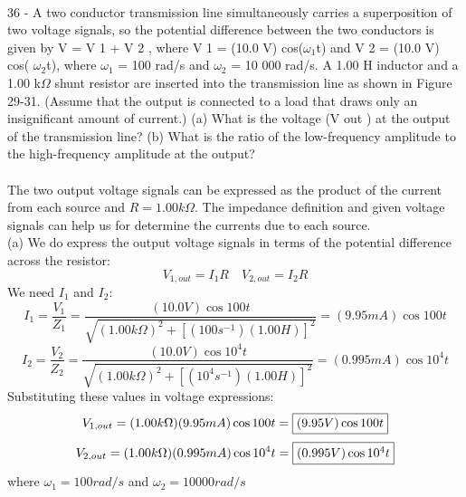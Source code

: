\documentclass{report}
\begin{document}
\paragraph{}
36 - A two conductor transmission line simultaneously carries a superposition of two voltage signals, so the potential difference between the two conductors is given by V = V 1 + V 2 , where V 1 = (10.0 V) cos($\omega{_1}$t) and V 2 = (10.0 V) cos( $\omega{_2}$t), where $\omega{_1}$ = 100 rad/s and $\omega{_2}$ = 10 000 rad/s. A 1.00 H inductor and a 1.00 k$\Omega$ shunt resistor are inserted into the transmission line as shown in Figure 29-31. (Assume that the output is connected to a load that draws only an insignificant amount of current.) (a) What is the voltage (V out ) at the output of the transmission line? (b) What is the ratio of the low-frequency amplitude to the high-frequency amplitude at the output?\\
\\
The two output voltage signals can be expressed as the product of the current from each source and $R = 1.00 k\Omega$. The impedance definition and given voltage signals can help us for determine the currents due to each source.\\
(a) We do express the output voltage signals in terms of the potential difference across the resistor:
$$V_{1,out} = I_1R \quad V_{2,out} = I_2R$$
We need $I_1$ and $I_2$:
$$I_1 = \frac{V_1}{Z_1} = \frac{(10.0V)\cos 100t}{\sqrt{(1.00k\Omega)^2+[(100s^{-1})(1.00H)]^2}} = (9.95mA)\cos 100t$$
$$I_2 = \frac{V_2}{Z_2} = \frac{(10.0V)\cos 10^4t}{\sqrt{(1.00k\Omega)^2+[(10^4s^{-1})(1.00H)]^2}} = (0.995mA)\cos 10^4t$$
Substituting these values in voltage expressions:
$$V_{1,out} = (1.00k\Omega)(9.95mA)\cos 100t = \fbox{$(9.95V)\cos 100t$}$$
$$V_{2,out} = (1.00k\Omega)(0.995mA)\cos 10^4t = \fbox{$(0.995V)\cos 10^4t$}$$
where $\omega_1 = 100 rad/s$ and $\omega_2 = 10000 rad/s$
\end{document}
